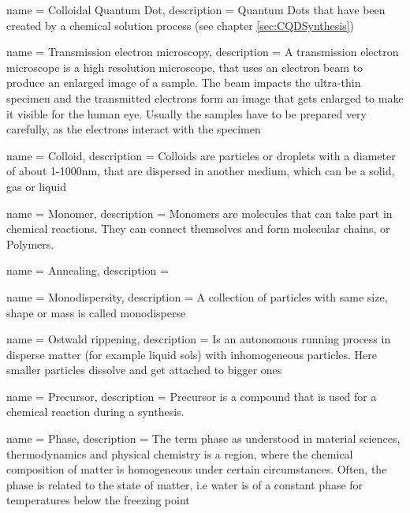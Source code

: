 
	{
	name				=	{Colloidal Quantum Dot},
	description	=	{Quantum Dots that have been created  by a chemical solution process (see chapter \ref{sec:CQDSynthesis})}
	}

	{
	name				= {Transmission electron microscopy},
	description	= {A transmission electron microscope is a high resolution microscope, that uses an electron beam to produce an
								 enlarged image of a sample. The beam impacts the ultra-thin specimen and the transmitted electrons form an image
								 that gets enlarged to make it visible for the human eye. Usually the samples have to be prepared very carefully,
								 as the electrons interact with the specimen}
	}
	
	{
	name				= {Colloid},
	description	= {Colloids are particles or droplets with a diameter of about 1-1000nm, that are dispersed in another medium,
								 which can be a solid, gas or liquid}
	}
	
	{
	name				= {Monomer},
	description	= {Monomers are molecules that can take part in chemical reactions. They can connect themselves and form molecular chains,
								 or Polymers.}
	}
	
	{
	name				= {Annealing},
	description	= {}
	}
	
	{
	name				= {Monodispersity},
	description	= {A collection of particles with same size, shape or mass is called monodisperse}
	}
	
	{
	name				= {Ostwald rippening},
	description	= {Is an autonomous running process in disperse matter (for example liquid sols) with inhomogeneous particles.
								 Here smaller particles dissolve and get attached to bigger ones}
	}
	
	{
	name				= {Precursor},
	description	= {Precursor is a compound that is used for a chemical reaction during a synthesis.}
	}
	
	{
	name				= {Phase},
	description	= {The term phase as understood in material sciences, thermodynamics and physical chemistry is a region, where the chemical composition
								 of matter is homogeneous under certain circumstances. 
								 Often, the phase is related to the state of matter, i.e water is of a constant phase for temperatures below the freezing point}
	}
	
